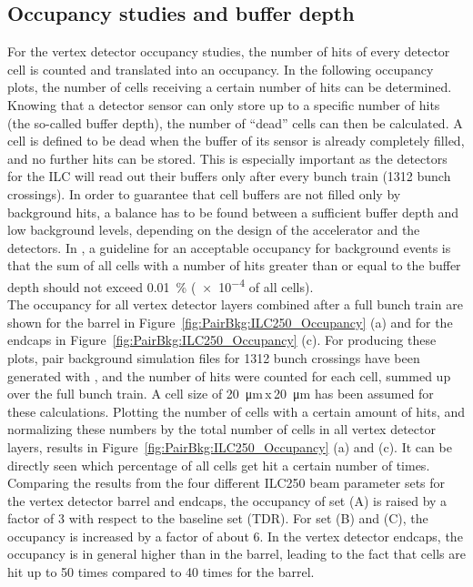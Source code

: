 \subsection{Occupancy studies and buffer depth}
\label{PairBkg:occupancy}
For the vertex detector occupancy studies, the number of hits of every detector cell is counted and translated into an occupancy.
In the following occupancy plots, the number of cells receiving a certain number of hits can be determined.
Knowing that a detector sensor can only store up to a specific number of hits (the so-called buffer depth), the number of ``dead'' cells can then be calculated.
A cell is defined to be dead when the buffer of its sensor is already completely filled, and no further hits can be stored.
This is especially important as the detectors for the ILC will read out their buffers only after every bunch train (\num{1312} bunch crossings).
In order to guarantee that cell buffers are not filled only by background hits, a balance has to be found between a sufficient buffer depth and low background levels, depending on the design of the accelerator and the detectors.
In \sid, a guideline for an acceptable occupancy for background events is that the sum of all cells with a number of hits greater than or equal to the buffer depth should not exceed \SI{0.01}{\percent} (\num{e-4} of all cells). 
\\The occupancy for all vertex detector layers combined after a full bunch train are shown for the barrel in Figure~\ref{fig:PairBkg:ILC250_Occupancy} (a) and for the endcaps in Figure~\ref{fig:PairBkg:ILC250_Occupancy} (c).
For producing these plots, pair background simulation files for \num{1312} bunch crossings have been generated with \guineapig, and the number of hits were counted for each cell, summed up over the full bunch train.
A cell size of \SI{20}{\micro\meter}\,x\,\SI{20}{\micro\meter} has been assumed for these calculations.
Plotting the number of cells with a certain amount of hits, and normalizing these numbers by the total number of cells in all vertex detector layers, results in Figure~\ref{fig:PairBkg:ILC250_Occupancy} (a) and (c).
It can be directly seen which percentage of all cells get hit a certain number of times.
Comparing the results from the four different ILC250 beam parameter sets for the vertex detector barrel and endcaps, the occupancy of set (A) is raised by a factor of 3 with respect to the baseline set (TDR).
For set (B) and (C), the occupancy is increased by a factor of about 6.
In the vertex detector endcaps, the occupancy is in general higher than in the barrel, leading to the fact that cells are hit up to 50 times compared to 40 times for the barrel.
